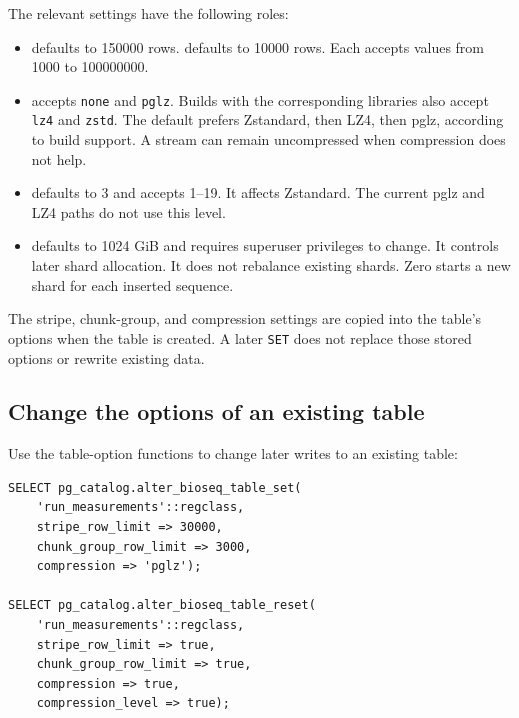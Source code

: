 The relevant settings have the following roles:
\begin{itemize}
  \item {} defaults to 150000 rows.
     defaults to 10000 rows.
    Each accepts values from 1000 to 100000000.
  \item {} accepts
    \texttt{none} and \texttt{pglz}. Builds with the corresponding libraries
    also accept \texttt{lz4} and \texttt{zstd}. The default prefers
    Zstandard, then LZ4, then pglz, according to build support.
    A stream can remain uncompressed when compression does not help.
  \item {} defaults to 3 and accepts
    1--19. It affects Zstandard. The current pglz and LZ4 paths do not use
    this level.
  \item {} defaults to
    1024 GiB and requires superuser privileges to change. It controls
    later shard allocation. It does not rebalance existing shards.
    Zero starts a new shard for each inserted sequence.
\end{itemize}

The stripe, chunk-group, and compression settings are copied into the
table's options when the table is created. A later \texttt{SET} does not
replace those stored options or rewrite existing data.

\subsection{Change the options of an existing table}

Use the table-option functions to change later writes to an existing table:

\par\noindent\begin{minipage}{\linewidth}
\begin{lstlisting}[style=bioseq-appendix-sql,
  caption={Change stored options, then reset them to current GUC values.}]
SELECT pg_catalog.alter_bioseq_table_set(
    'run_measurements'::regclass,
    stripe_row_limit => 30000,
    chunk_group_row_limit => 3000,
    compression => 'pglz');

SELECT pg_catalog.alter_bioseq_table_reset(
    'run_measurements'::regclass,
    stripe_row_limit => true,
    chunk_group_row_limit => true,
    compression => true,
    compression_level => true);
\end{lstlisting}
\end{minipage}

